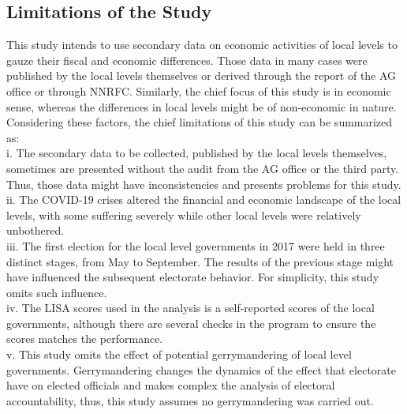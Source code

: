 \subsection{Limitations of the Study}
This study intends to use secondary data on economic activities of local levels to gauze their fiscal and economic differences. Those data in many cases were published by the local levels themselves or derived through the report of the AG office or through NNRFC. Similarly, the chief focus of this study is in economic sense, whereas the differences in local levels might be of non-economic in nature. Considering these factors, the chief limitations of this study can be summarized as:\\
i. \hspace{3mm} The secondary data to be collected, published by the local levels themselves, sometimes are presented without the audit from the AG office or the third party. Thus, those data might have inconsistencies and presents problems for this study.\\
ii.\hspace{3mm} The COVID-19 crises altered the financial and economic landscape of the local levels, with some suffering severely while other local levels were relatively unbothered.\\ 
iii.\hspace{3mm} The first election for the local level governments in 2017 were held in three distinct stages, from May to September. The results of the previous stage might have influenced the subsequent electorate behavior. For simplicity, this study omits such influence.\\
iv.\hspace{3mm} The LISA scores used in the analysis is a self-reported scores of the local governments, although there are several checks in the program to ensure the scores matches the performance. \\
v.\hspace{3mm} This study omits the effect of potential gerrymandering of local level governments. Gerrymandering changes the dynamics of the effect that electorate have on elected officials and makes complex the analysis of electoral accountability, thus, this study assumes no gerrymandering was carried out. \vspace{-3mm}
